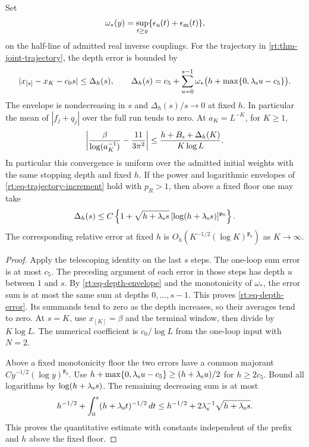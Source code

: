 \documentclass[11pt,letterpaper,reqno]{amsart}
\makeatletter
\numberwithin{equation}{section}
\theoremstyle{definition}
\newcommand{\ms@majorstart}{%
  \pushQED{\qed}\renewcommand{\qedsymbol}{$\blacksquare\square$}}
\newenvironment{theorem}[1][]{\ms@majorstart\ms@theorem[#1]}
  {\popQED\endms@theorem}
\theoremstyle{remark}
\makeatother
\begin{document}
\begin{theorem}[Uniform ultraviolet asymptotics]
\label{rt:thm-ultraviolet-law}
Set
\[
 \omega_*(y)=\sup_{t\ge y}
                 \{\epsilon_{\rm u}(t)+\epsilon_{\rm m}(t)\},
\]
on the half-line of admitted real inverse couplings. For the
trajectory in \cref{rt:thm-joint-trajectory}, the depth error is
bounded by
\begin{equation}\label{rt:eq-depth-error}
 |x_{[s]}-x_K-c_0s|\le \Delta_h(s),\qquad
 \Delta_h(s)=c_5+\sum_{u=0}^{s-1}
       \omega_*\bigl(h+\max\{0,\lambda_{\rm s}u-c_5\}\bigr).
\end{equation}
The envelope is nondecreasing in \(s\) and
\(\Delta_h(s)/s\to0\) at fixed \(h\). In particular the
mean of \(|f_j+q_j|\) over the full run tends to zero.
At \(a_K=L^{-K}\),
for \(K\ge1\),
\[
  \left|\frac{\beta}{\log(a_K^{-1})}
                  -\frac{11}{3\pi^2}\right|
  \le \frac{h+B_{\rm s}+\Delta_h(K)}{K\log L}.
\]
In particular this convergence is uniform over the admitted
initial weights with the same stopping depth and fixed \(h\).
If the power and logarithmic envelopes of
\cref{rt:eq-trajectory-increment} hold with \(p_R>1\), then
above a fixed floor one may take
\[
     \Delta_h(s)\le C\left\{1+\sqrt{h+\lambda_{\rm s}s}\,
                         [\log(h+\lambda_{\rm s}s)]^{\mathfrak p_0}\right\}.
\]
The corresponding relative error at fixed \(h\) is
\(O_h(K^{-1/2}(\log K)^{\mathfrak p_0})\) as \(K\to\infty\).
\end{theorem}
\begin{proof}
Apply the telescoping identity on the last \(s\) steps. The
one-loop sum error is at most \(c_5\). The preceding argument
of each error in those steps has depth \(u\) between \(1\)
and \(s\). By \cref{rt:eq-depth-envelope} and the monotonicity
of \(\omega_*\), the error sum is at most the same sum at
depths \(0,\ldots,s-1\). This proves \cref{rt:eq-depth-error}.
Its summands tend to zero as the depth increases, so their
averages tend to zero. At \(s=K\), use \(x_{[K]}=\beta\)
and the terminal window, then divide by \(K\log L\).
The numerical coefficient is \(c_0/\log L\) from the
one-loop input with \(N=2\).

Above a fixed monotonicity floor the two errors have a
common majorant \(C y^{-1/2}(\log y)^{\mathfrak p_0}\).
Use \(h+\max\{0,\lambda_{\rm s}u-c_5\}\ge
(h+\lambda_{\rm s}u)/2\) for \(h\ge2c_5\).
Bound all logarithms by
\(\log(h+\lambda_{\rm s}s)\). The remaining decreasing
sum is at most
\[
 h^{-1/2}+\int_0^s (h+\lambda_{\rm s}t)^{-1/2}\,dt
 \le h^{-1/2}+2\lambda_{\rm s}^{-1}\sqrt{h+\lambda_{\rm s}s}.
\]
This proves the quantitative estimate with constants independent of
the prefix and \(h\) above the fixed floor.
\end{proof}
\end{document}
